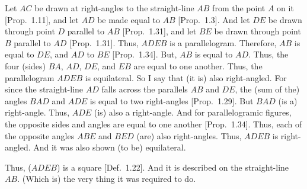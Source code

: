 \begin{Parallel}{}{}
{Let $AC$ be drawn at right-angles to the straight-line $AB$
from the point $A$ on it [Prop.~1.11], and let $AD$ be
made equal to $AB$ [Prop.~1.3]. And let $DE$ be drawn
through point $D$ parallel to $AB$ [Prop.~1.31], and let $BE$ be
drawn through point $B$ parallel to $AD$ [Prop.~1.31]. Thus,
$ADEB$ is a parallelogram. Therefore, $AB$ is equal to $DE$, and $AD$ to $BE$ [Prop.~1.34]. But, $AB$ is equal to $AD$. Thus, the four (sides) $BA$, $AD$, $DE$, and $EB$ are equal to one another. Thus, the parallelogram $ADEB$ is equilateral.
So I say that (it is) also right-angled. For since the straight-line $AD$ falls
across the parallels $AB$ and $DE$, the (sum of the) angles $BAD$ and $ADE$ is
equal to two right-angles [Prop.~1.29]. But $BAD$ (is a) right-angle. Thus,
$ADE$ (is) also a right-angle. And for parallelogramic figures, the opposite
sides and angles are equal to one another [Prop.~1.34]. Thus, each of the
opposite angles $ABE$ and $BED$ (are) also right-angles. Thus, $ADEB$ is
right-angled. And it was also shown (to be) equilateral.

Thus, ($ADEB$) is a square [Def.~1.22]. And it is described on the straight-line $AB$. (Which is) the very thing it was required to do.}
\end{Parallel}

